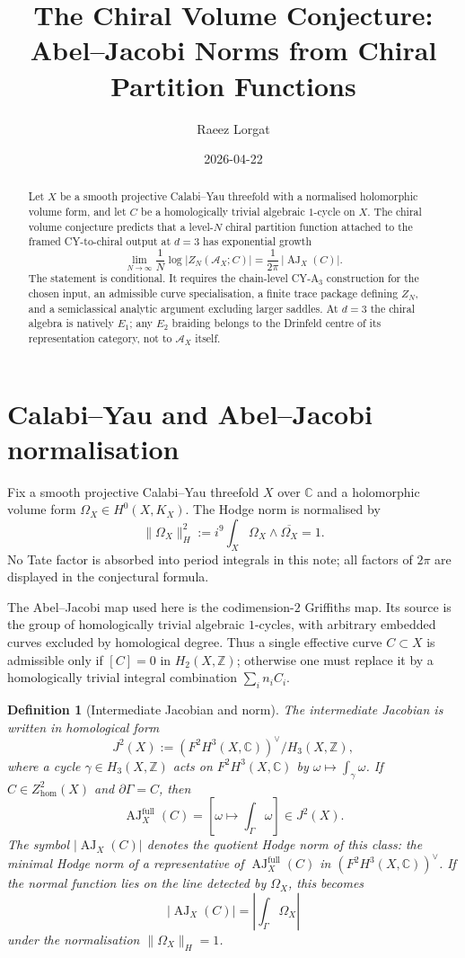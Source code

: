 \documentclass[11pt]{article}
\title{\texorpdfstring{The Chiral Volume Conjecture:\\
Abel--Jacobi Norms from Chiral Partition Functions}
{The Chiral Volume Conjecture: Abel-Jacobi Norms from Chiral Partition Functions}}
\author{Raeez Lorgat}
\date{2026-04-22}
\newtheorem{definition}[theorem]{Definition}
\newcommand{\cA}{\mathcal{A}}
\newcommand{\bC}{\mathbb{C}}
\newcommand{\bZ}{\mathbb{Z}}
\newcommand{\AJ}{\operatorname{AJ}}
\begin{document}
\maketitle

\begin{abstract}
Let $X$ be a smooth projective Calabi--Yau threefold with a normalised
holomorphic volume form, and let $C$ be a homologically trivial algebraic
$1$-cycle on $X$. The chiral volume conjecture predicts that a
level-$N$ chiral partition function attached to the framed
CY-to-chiral output at $d=3$ has exponential growth
\[
  \lim_{N \to \infty} \frac{1}{N}
  \log \bigl|Z_N(\cA_X;C)\bigr|
  =
  \frac{1}{2\pi}\,\bigl|\AJ_X(C)\bigr|.
\]
The statement is conditional. It requires the chain-level CY-A$_3$
construction for the chosen input, an admissible curve specialisation,
a finite trace package defining $Z_N$, and a semiclassical analytic
argument excluding larger saddles. At $d=3$ the chiral algebra is
natively $E_1$; any $E_2$ braiding belongs to the Drinfeld centre of
its representation category, not to $\cA_X$ itself.
\end{abstract}

\section{Calabi--Yau and Abel--Jacobi normalisation}
\label{sec:aj-normalisation}

Fix a smooth projective Calabi--Yau threefold $X$ over $\bC$ and a
holomorphic volume form $\Omega_X\in H^0(X,K_X)$. The Hodge norm is
normalised by
\[
  \|\Omega_X\|^2_H
  :=
  i^9\int_X \Omega_X\wedge \overline{\Omega_X}
  =
  1.
\]
No Tate factor is absorbed into period integrals in this note; all
factors of $2\pi$ are displayed in the conjectural formula.

The Abel--Jacobi map used here is the codimension-$2$ Griffiths map.
Its source is the group of homologically trivial algebraic $1$-cycles,
with arbitrary embedded curves excluded by homological degree. Thus a
single effective curve $C\subset X$ is admissible only if $[C]=0$ in
$H_2(X,\bZ)$; otherwise one must replace it by a homologically trivial
integral combination
$\sum_i n_i C_i$.

\begin{definition}[Intermediate Jacobian and norm]
\label{def:aj-norm}
The intermediate Jacobian is written in homological form
\[
  J^2(X)
  :=
  (F^2H^3(X,\bC))^\vee/H_3(X,\bZ),
\]
where a cycle $\gamma\in H_3(X,\bZ)$ acts on $F^2H^3(X,\bC)$ by
$\omega\mapsto \int_\gamma\omega$.  If $C\in Z^2_{\mathrm{hom}}(X)$
and $\partial\Gamma=C$, then
\[
  \AJ_X^{\mathrm{full}}(C)
  =
  \left[
    \omega\longmapsto \int_\Gamma\omega
  \right]
  \in J^2(X).
\]
The symbol $|\AJ_X(C)|$ denotes the quotient Hodge norm of this class:
the minimal Hodge norm of a representative of
$\AJ_X^{\mathrm{full}}(C)$ in $(F^2H^3(X,\bC))^\vee$.  If the normal
function lies on the line detected by $\Omega_X$, this becomes
\[
  |\AJ_X(C)|
  =
  \left|\int_\Gamma \Omega_X\right|
\]
under the normalisation $\|\Omega_X\|_H=1$.
\end{definition}
\end{document}
